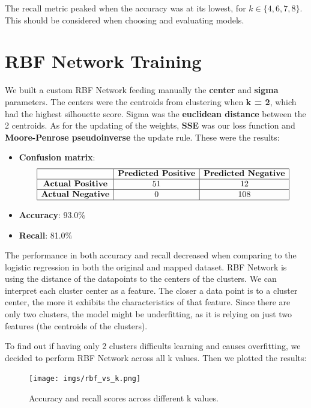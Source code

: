 \documentclass[a4paper,12pt]{article}
\begin{document}
The recall metric peaked when the accuracy was at its lowest, for \( k \in \{ 4, 6, 7, 8 \} \). This should be considered when choosing and evaluating models.



\section{RBF Network Training}
\label{sec:rbf-network}
We built a custom RBF Network feeding manually the \textbf{center} and \textbf{sigma} parameters. The centers were the centroids from clustering when \textbf{k = 2}, which had the highest silhouette score. Sigma was the \textbf{euclidean distance} between the 2 centroids. As for the updating of the weights, \textbf{SSE} was our loss function and \textbf{Moore-Penrose pseudoinverse} the update rule. These were the results:
\begin{itemize}
    \item \textbf{Confusion matrix}: 
    \[
    \begin{array}{|c|c|c|}
    \hline
    & \textbf{Predicted Positive} & \textbf{Predicted Negative} \\
    \hline
    \textbf{Actual Positive} & 51 & 12 \\
    \hline
    \textbf{Actual Negative} & 0 & 108 \\
    \hline
    \end{array}
    \]
    \item \textbf{Accuracy}: 93.0\%
    \item \textbf{Recall}: 81.0\%
\end{itemize}
The performance in both accuracy and recall decreased when comparing to the logistic regression in both the original and mapped dataset.  RBF Network is using the distance of the datapoints to the centers of the clusters. We can interpret each cluster center as a feature. The closer a data point is to a cluster center, the more it exhibits the characteristics of that feature. Since there are only two clusters, the model might be underfitting, as it is relying on just two features (the centroids of the clusters).

To find out if having only 2 clusters difficults learning and causes overfitting, we decided to perform RBF Network across all k values. Then we plotted the results:
\begin{figure}[H]
    \centering
    \texttt{[image: imgs/rbf\_vs\_k.png]}
    \caption{Accuracy and recall scores across different k values.}
    \label{fig:acc_recall}
\end{figure}
\end{document}
